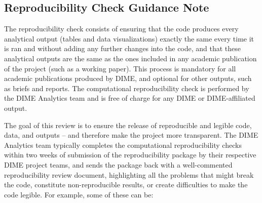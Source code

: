 \begin{fullwidth}
		\noindent {}

		\noindent {}

		\noindent {}

		\noindent {}

		\noindent {}

		\noindent {}

		\noindent {}

		\noindent {}

	\newpage
	\section*{Reproducibility Check Guidance Note}

	The reproducibility check consists of ensuring that the code produces every analytical output (tables and data visualizations) exactly the same every time it is ran and without adding any further changes into the code, and that these analytical outputs are the same as the ones included in any academic publication of the project (such as a working paper). This process is mandatory for all academic publications produced by DIME, and optional for other outputs, such as briefs and reports. The computational reproducibility check is performed by the DIME Analytics team and is free of charge for any DIME or DIME-affiliated output.

	\bigskip

	The goal of this review is to ensure the release of reproducible and legible code, data, and outputs – and therefore make the project more transparent. The DIME Analytics team typically completes the computational reproducibility checks within two weeks of submission of the reproducibility package by their respective DIME project teams, and sends the package back with a well-commented reproducibility review document, highlighting all the problems that might break the code, constitute non-reproducible results, or create difficulties to make the code legible. For example, some of these can be:


\end{fullwidth}
